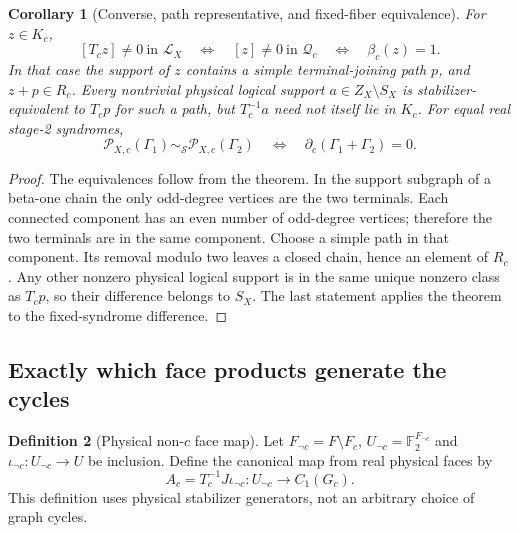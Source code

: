 \documentclass[11pt]{article}
\theoremstyle{definition}
\newtheorem{definition}{Definition}[section]
\theoremstyle{plain}
\newtheorem{corollary}[definition]{Corollary}
\theoremstyle{remark}
\newcommand{\F}{\mathbb F_2}
\begin{document}
\begin{corollary}[Converse, path representative, and fixed-fiber equivalence]
\label{cor:representatives}
For $z\in K_c$,
\[
 [T_cz]\ne0\ \text{in }\mathcal L_X
 \quad\Longleftrightarrow\quad [z]\ne0\ \text{in }\mathcal Q_c
 \quad\Longleftrightarrow\quad \beta_c(z)=1.
\]
In that case the support of $z$ contains a simple terminal-joining
path $p$, and $z+p\in R_c$. Every nontrivial physical logical support
$a\in Z_X\setminus S_X$ is stabilizer-equivalent to $T_cp$ for such
a path, but $T_c^{-1}a$ need not itself lie in $K_c$.
For equal real stage-2 syndromes,
\[
 \mathscr P_{X,c}(\Gamma_1)\sim_{\mathcal S}\mathscr P_{X,c}(\Gamma_2)
 \quad\Longleftrightarrow\quad
 \partial_c(\Gamma_1+\Gamma_2)=0 .
\]
\end{corollary}
\begin{proof}
The equivalences follow from the theorem. In the support subgraph of
a beta-one chain the only odd-degree vertices are the two terminals.
Each connected component has an even number of odd-degree vertices;
therefore the two terminals are in the same component. Choose a
simple path in that component. Its removal modulo two leaves a
closed chain, hence an element of $R_c$.
Any other nonzero physical logical support is in the same unique
nonzero class as $T_cp$, so their difference belongs to $S_X$.
The last statement applies the theorem to the fixed-syndrome difference.
\end{proof}

\subsection{Exactly which face products generate the cycles}
\begin{definition}[Physical non-\(c\) face map]\label{def:facemap}
Let $F_{\neg c}=F\setminus F_c$, $U_{\neg c}=\F^{F_{\neg c}}$ and
$\iota_{\neg c}:U_{\neg c}\to U$ be inclusion.
Define the canonical map from real physical faces by
\[
 A_c=T_c^{-1}J\iota_{\neg c}:U_{\neg c}\longrightarrow C_1(G_c).
\]
This definition uses physical stabilizer generators, not an arbitrary
choice of graph cycles.
\end{definition}
\end{document}
